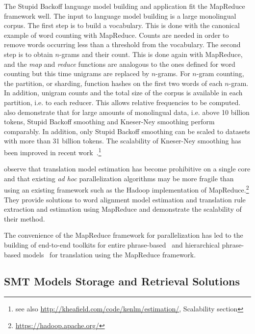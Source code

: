 The Stupid Backoff language model building and application fit the
MapReduce framework well. The input to language model building
is a large monolingual corpus. The first step is to build
a vocabulary. This is done with the canonical example of word
counting with MapReduce. Counts %
are needed in order to remove words occurring less than a threshold
from the vocabulary. The second step is to obtain $n$-grams and their
count. This is done again with MapReduce, and the \emph{map} and \emph{reduce}
functions are analogous to the ones defined for word counting but this time
unigrams are replaced by $n$-grams.
For $n$-gram counting, the partition, or sharding, function hashes
on the first two words of each $n$-gram. In addition, unigram counts
and the total size of the corpus is available in each partition, i.e.
to each reducer. This allows relative frequencies to be computed.
\citet{brants-popat-xu-och-dean:2007:EMNLP-CoNLL} also
demonstrate
that for large amounts of monolingual data, i.e. above 10 billion
tokens, Stupid Backoff smoothing and Kneser-Ney smoothing perform comparably.
In addition, only
Stupid Backoff smoothing can be scaled to datasets
with more than 31 billion tokens. The scalability of Kneser-Ney
smoothing has been improved in recent work~\citep{heafield-pouzyrevsky-clark-koehn:2013:ACL}.\footnote{see also \url{http://kheafield.com/code/kenlm/estimation/}, Scalability section}

\citet{dyer-cordova-mont-lin:2008:WMT}
observe that translation model estimation has become prohibitive
on a single core and that existing \emph{ad hoc} parallelization
algorithms may be more fragile than using an existing framework such
as the Hadoop implementation of
MapReduce.\footnote{\url{https://hadoop.apache.org/}}
They provide solutions to word alignment model
estimation and translation rule extraction and estimation using MapReduce
and demonstrate the scalability of their method.

The convenience
of the MapReduce framework for parallelization has led to the building
of end-to-end toolkits for entire phrase-based~\citep{gao-vogel:2010:PBML} and
hierarchical phrase-based models~\citep{venugopal-zollmann:2009:PBML}
for translation using the MapReduce framework.

\subsection{SMT Models Storage and Retrieval Solutions}

